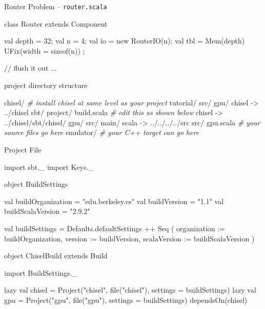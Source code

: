 \documentclass[xcolor=pdflatex,dvipsnames,table]{beamer}
\newenvironment{FramedSemiVerb}%
{\begin{Sbox}\begin{minipage}{.94\textwidth}\begin{semiverbatim}}%
{\end{semiverbatim}\end{minipage}\end{Sbox}
\setlength{\fboxsep}{8pt}\fbox{\TheSbox}}
\newenvironment{FramedVerb}%
{\VerbatimEnvironment
\begin{Sbox}\begin{minipage}{.94\textwidth}\begin{Verbatim}}%
{\end{Verbatim}\end{minipage}\end{Sbox}
\setlength{\fboxsep}{8pt}\fbox{\TheSbox}}
\newcommand{\comment}[1]{{\color{Green}\it\smaller #1}}
\begin{document}
\begin{frame}[fragile]{Router Problem -- \tt router.scala}
\begin{scala}
class Router extends Component {
  val depth = 32;
  val n     = 4;
  val io    = new RouterIO(n);
  val tbl   = Mem(depth){ UFix(width = sizeof(n)) };
  
  // flush it out ...
}
\end{scala}
\end{frame}



\begin{frame}[fragile]{project directory structure}
\begin{footnotesize}
\begin{FramedSemiVerb}
chisel/           \comment{\# install chisel at same level as your project}
  tutorial/
  src/
gpu/
  chisel -> ../chisel
  sbt/
    project/
      build.scala \comment{\# edit this as shown below}
    chisel -> ../chisel/sbt/chisel/
    gpu/
      src/
        main/
          scala -> ../../../../src
  src/ 
    gpu.scala     \comment{\# your source files go here}
  emulator/       \comment{\# your C++ target can go here}
\end{FramedSemiVerb}
\end{footnotesize}

\end{frame}

\begin{frame}[fragile]{Project File}

{
\begin{scala}
import sbt._
import Keys._

object BuildSettings {
  val buildOrganization = "edu.berkeley.cs"
  val buildVersion = "1.1"
  val buildScalaVersion = "2.9.2"

  val buildSettings = Defaults.defaultSettings ++ Seq (
    organization := buildOrganization,
    version      := buildVersion,
    scalaVersion := buildScalaVersion
  )
}

object ChiselBuild extends Build {
  import BuildSettings._

  lazy val chisel = 
    Project("chisel", file("chisel"), 
      settings = buildSettings)
  lazy val gpu =
    Project("gpu", file("gpu"), settings = buildSettings) 
      dependsOn(chisel)
}
\end{scala}
}

\end{frame}
\end{document}
